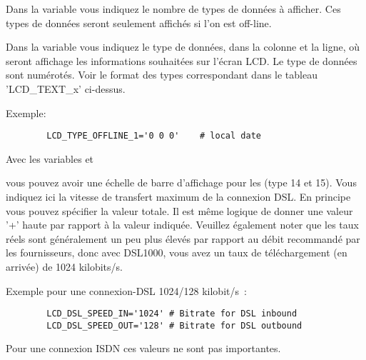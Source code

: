 \begin{description}

      Dans la variable  vous indiquez le nombre
      de types de données à afficher. Ces types de données seront seulement
      affichés si l'on est off-line.



        Dans la variable  vous indiquez le
        type de données, dans la colonne et la ligne, où seront affichage les
        informations souhaitées sur l'écran LCD. Le type de données sont
        numérotés. Voir le format des types correspondant dans le tableau
        'LCD\_TEXT\_x' ci-dessus.

        Exemple:
\begin{example}
\begin{verbatim}
        LCD_TYPE_OFFLINE_1='0 0 0'    # local date
\end{verbatim}
\end{example}


        Avec les variables  et 

        vous pouvez avoir une échelle de barre d'affichage pour les (type 14 et 15).
        Vous indiquez ici la vitesse de transfert maximum de la connexion DSL.
        En principe vous pouvez spécifier la valeur totale. Il est même logique de
        donner une valeur '+' haute par rapport à la valeur indiquée. Veuillez
        également noter que les taux réels sont généralement un peu plus élevés
        par rapport au débit recommandé par les fournisseurs, donc avec DSL1000,
        vous avez un taux de téléchargement (en arrivée) de 1024 kilobits/s.

        Exemple pour une connexion-DSL 1024/128 kilobit/s~:
\begin{example}
\begin{verbatim}
        LCD_DSL_SPEED_IN='1024' # Bitrate for DSL inbound
        LCD_DSL_SPEED_OUT='128' # Bitrate for DSL outbound
\end{verbatim}
\end{example}

        Pour une connexion ISDN ces valeurs ne sont pas importantes.

\end{description}


